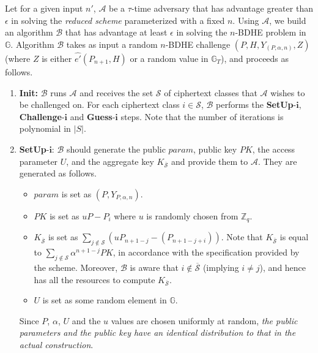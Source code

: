 \textbf{} Let for a given input $n'$, $\mathcal{A}$ be a $\tau$-time adversary that has advantage greater than $\epsilon$ in solving the \emph{reduced scheme} parameterized with a fixed $n$. Using $\mathcal{A}$, we build an algorithm $\mathcal{B}$ that has advantage at least $\epsilon$ in solving the $n$-BDHE problem in $\mathbb{G}$. Algorithm $\mathcal{B}$ takes as input a random $n$-BDHE challenge $(P,H,Y_{(P,\alpha,n)},Z)$ (where $Z$ is either $\hat{e'}(P_{n+1},H)$ or a random value in $\mathbb{G}_T$), and proceeds as follows.

\begin{enumerate}
 \item \textbf{Init:} $\mathcal{B}$ runs $\mathcal{A}$ and receives the set $\mathcal{S}$ of ciphertext classes that $\mathcal{A}$ wishes to be challenged on. For each ciphertext class $i\in\mathcal{S}$, $\mathcal{B}$ performs the \textbf{SetUp}-$\mathbf{i}$, \textbf{Challenge}-$\mathbf{i}$ and \textbf{Guess}-$\mathbf{i}$ steps. Note that the number of iterations is polynomial in $|S|$. 
 
 \item \textbf{SetUp}-$\mathbf{i}$: $\mathcal{B}$ should generate the public $param$, public key $PK$, the access parameter $U$, and the aggregate key $K_{\overline{\mathcal{S}}}$ and provide them to $\mathcal{A}$. They are generated as follows.
 \begin{itemize}
  \item $param$ is set as $(P,Y_{P,\alpha,n})$.
  \item $PK$ is set as $uP - P_i$ where $u$ is randomly chosen from $\mathbb{Z}_q$.
  \item $K_{\overline{\mathcal{S}}}$ is set as $\sum_{j\notin\mathcal{S}}({u}P_{n+1-j}-(P_{n+1-j+i}))$. Note that $K_{\overline{\mathcal{S}}}$ is equal to $\sum_{j\notin\mathcal{S}}\alpha^{n+1-j}PK$, in accordance with the specification provided by the scheme. Moreover, $\mathcal{B}$ is aware that $i\notin \overline{\mathcal{S}}$ (implying $i\neq j$), and hence has all the resources to compute $K_{\overline{\mathcal{S}}}$.
  \item $U$ is set as some random element in $\mathbb{G}$.
 \end{itemize}
 
 Since $P$, $\alpha$, $U$ and the $u$ values are chosen uniformly at random, \emph{the public parameters and the public key have an identical distribution to that in the actual construction}.
 

\end{enumerate}

